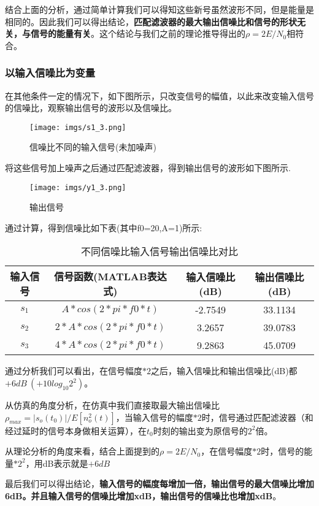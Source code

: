 \documentclass[a4paper]{article}
\begin{document}
结合上面的分析，通过简单计算我们可以得知这些新号虽然波形不同，但是能量是相同的。因此我们可以得出结论，{\bfseries 匹配滤波器的最大输出信噪比和信号的形状无关，与信号的能量有关}。这个结论与我们之前的理论推导得出的$\rho = 2E/N_0$相符合。
\subsubsection{以输入信噪比为变量}
在其他条件一定的情况下，如下图所示，只改变信号的幅值，以此来改变输入信号的信噪比，观察输出信号的波形以及信噪比。
\begin{figure}[h]
\centering
\texttt{[image: imgs/s1\_3.png]}
\caption{信噪比不同的输入信号(未加噪声)}
\end{figure}

将这些信号加上噪声之后通过匹配滤波器，得到输出信号的波形如下图所示.
\newpage

\begin{figure}[h]
\centering
\texttt{[image: imgs/y1\_3.png]}
\caption{输出信号}
\end{figure}

通过计算，得到信噪比如下表(其中f0=20,A=1)所示:


\begin{table}[h]
\centering
\caption{不同信噪比输入信号输出信噪比对比}
\begin{tabular}[h]{cccc}
\hline
输入信号&信号函数(MATLAB表达式)& 输入信噪比(dB)& 输出信噪比(dB)\\
\hline
$s_1$&$A*cos(2*pi*f0*t)$&-2.7549&33.1134 \\
$s_2$&$2*A*cos(2*pi*f0*t)$&3.2657&39.0783\\
$s_3$&$4*A*cos(2*pi*f0*t)$&9.2863&45.0709\\
\hline
\end{tabular}
\end{table}

通过分析我们可以看出，在信号幅度$*2$之后，输入信噪比和输出信噪比(dB)都$+6dB\ (+10log_{10} 2^2)$。

从仿真的角度分析，在仿真中我们直接取最大输出信噪比$\rho_{max} = |s_{o}(t_0)|/E[n_o^2(t)]$，当输入信号的幅度$*2$时，信号通过匹配滤波器（和经过延时的信号本身做相关运算），在$t_0$时刻的输出变为原信号的$2^2$倍。

从理论分析的角度来看，结合上面提到的$\rho = 2E/N_0$，在信号幅度$*2$时，信号的能量$*2^2$，用dB表示就是$+6dB$

最后我们可以得出结论，{\bfseries 输入信号的幅度每增加一倍，输出信号的最大信噪比增加6dB。并且输入信号的信噪比增加xdB，输出信号的信噪比也增加xdB}。
\end{document}
